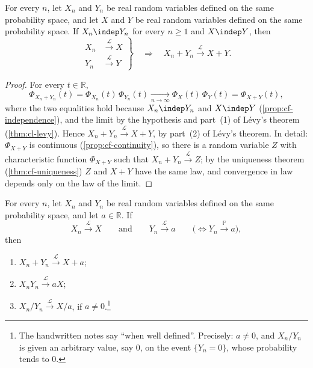 \begin{proposition}\label{prop:cl-sums}
For every $n$, let $X_n$ and $Y_n$ be real random variables defined on the same probability
space, and let $X$ and $Y$ be real random variables defined on the same probability space. If
$X_n\indep Y_n$ for every $n\ge1$ and $X\indep Y$, then
\[
  \left.\begin{aligned}X_n&\xrightarrow{\mathcal L}X\\ Y_n&\xrightarrow{\mathcal L}Y\end{aligned}\right\}
  \quad\Longrightarrow\quad X_n+Y_n\xrightarrow{\mathcal L}X+Y .
\]
\end{proposition}

\begin{proof}
For every $t\in\mathbb R$,
\[
  \Phi_{X_n+Y_n}(t)=\Phi_{X_n}(t)\,\Phi_{Y_n}(t)\xrightarrow[n\to\infty]{}\Phi_X(t)\,\Phi_Y(t)=\Phi_{X+Y}(t),
\]
where the two equalities hold because $X_n\indep Y_n$ and $X\indep Y$
(\cref{prop:cf-independence}), and the limit by the hypothesis and part~(1) of L\'evy's
theorem (\cref{thm:cl-levy}). Hence $X_n+Y_n\xrightarrow{\mathcal L}X+Y$, by part~(2) of
L\'evy's theorem. In detail: $\Phi_{X+Y}$ is continuous (\cref{prop:cf-continuity}), so there
is a random variable $Z$ with characteristic function $\Phi_{X+Y}$ such that
$X_n+Y_n\xrightarrow{\mathcal L}Z$; by the uniqueness theorem (\cref{thm:cf-uniqueness}) $Z$
and $X+Y$ have the same law, and convergence in law depends only on the law of the limit.
\end{proof}

\begin{theorem}\label{thm:cl-slutsky}
For every $n$, let $X_n$ and $Y_n$ be real random variables defined on the same probability
space, and let $a\in\mathbb R$. If
\[
  X_n\xrightarrow{\mathcal L}X\qquad\text{and}\qquad Y_n\xrightarrow{\mathcal L}a\qquad
  \big(\iff Y_n\xrightarrow{\mathbb P}a\big),
\]
then
\begin{enumerate}[label=(\arabic*)]
  \item $X_n+Y_n\xrightarrow{\mathcal L}X+a$;
  \item $X_nY_n\xrightarrow{\mathcal L}aX$;
  \item $X_n/Y_n\xrightarrow{\mathcal L}X/a$, if $a\neq0$.\footnote{The handwritten notes say
    ``when well defined''. Precisely: $a\neq0$, and $X_n/Y_n$ is given an arbitrary value, say
    $0$, on the event $\{Y_n=0\}$, whose probability tends to $0$.}
\end{enumerate}
\end{theorem}

